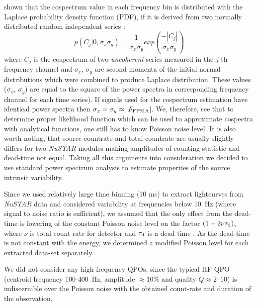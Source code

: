 \documentclass[a4paper,fleqn,usenatbib]{mnras}
\begin{document}
\citet{2017arXiv170909666H} shown that the cospectrum value in each frequency bin is distributed with the Laplace probability density function (PDF), if it is derived from two normally distributed random independent series \citep[see, e.q., eq.~14 in ][]{2017arXiv170909666H}:
\begin{equation}
        p(C_{j}|0, \sigma_x \sigma_y) = \frac{1}{\sigma_x \sigma_y} exp{\left(\frac{-|C_{j}|}{\sigma_x \sigma_y} \right)}
\end{equation}
where $C_{j}$ is the cospectrum of two {\it uncoherent} series measured in the $j$-th frequency channel and $\sigma_x$, $\sigma_y$  are second momenta of the initial normal distributions which were combined to produce Laplace distribution. 
These values ($\sigma_x$, $\sigma_y$) are equal to the square of the power spectra in corresponding frequency channel for each time series).
If signals used for the cospectrum estimation have identical power spectra then $\sigma_x = \sigma_y \approx |F_{\rm FPMA}|$.
We, therefore, see that to determine proper likelihood function which can be used to approximate cospectra with analytical functions, one still has to know Poisson noise level.
It is also worth noting, that source countrate and total countrate are usually slightly differs for two {\it NuSTAR} modules making amplitudes of counting-statistic and dead-time not equal.
Taking all this arguments into consideration we decided to use standard power spectrum analysis to estimate properties of the source intrinsic variability.

Since we used relatively large time binning (10 ms) to extract lightcurves from {\it NuSTAR} data and considered variability at frequencies below 10~Hz (where signal to noise ratio is sufficient), we assumed that the only effect from the dead-time is lowering of the constant Poisson noise level on the factor $(1 - 2\nu \tau_{\rm d})$, where $\nu$ is total count rate for detector and $\tau_{\rm d}$ is a dead time \citep{1994A&A...287...73V, 1995ApJ...449..930Z}. 
As the dead-time is not constant with the energy, we determined a modified Poisson level for each extracted data-set separately.


We did not consider any high frequency QPOs, since the typical HF QPO (centroid frequency 100-400~Hz, amplitude $\approx10$\% and quality $Q\approx2$--$10$) is indiscernible over the Poisson noise with the obtained count-rate and duration of the observation.
\end{document}
